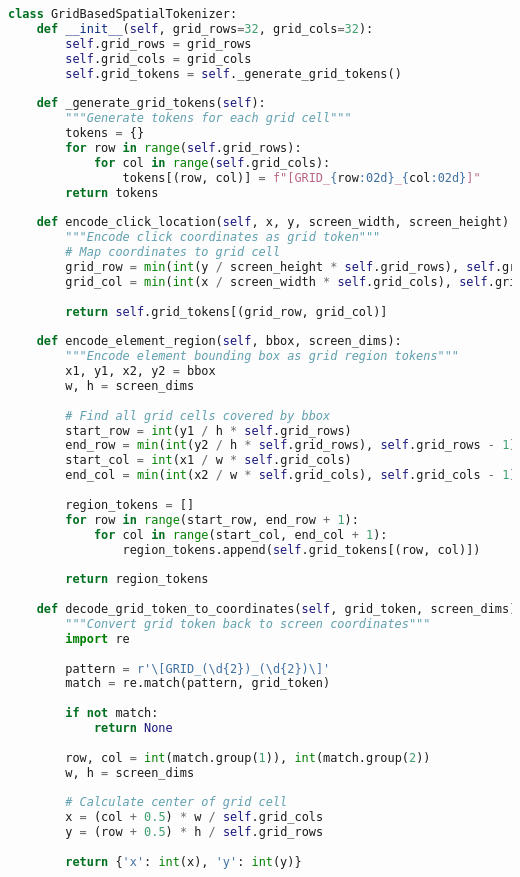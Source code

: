 \begin{lstlisting}[language=Python, caption=Grid-based spatial tokenization]
class GridBasedSpatialTokenizer:
    def __init__(self, grid_rows=32, grid_cols=32):
        self.grid_rows = grid_rows
        self.grid_cols = grid_cols
        self.grid_tokens = self._generate_grid_tokens()
        
    def _generate_grid_tokens(self):
        """Generate tokens for each grid cell"""
        tokens = {}
        for row in range(self.grid_rows):
            for col in range(self.grid_cols):
                tokens[(row, col)] = f"[GRID_{row:02d}_{col:02d}]"
        return tokens
    
    def encode_click_location(self, x, y, screen_width, screen_height):
        """Encode click coordinates as grid token"""
        # Map coordinates to grid cell
        grid_row = min(int(y / screen_height * self.grid_rows), self.grid_rows - 1)
        grid_col = min(int(x / screen_width * self.grid_cols), self.grid_cols - 1)
        
        return self.grid_tokens[(grid_row, grid_col)]
    
    def encode_element_region(self, bbox, screen_dims):
        """Encode element bounding box as grid region tokens"""
        x1, y1, x2, y2 = bbox
        w, h = screen_dims
        
        # Find all grid cells covered by bbox
        start_row = int(y1 / h * self.grid_rows)
        end_row = min(int(y2 / h * self.grid_rows), self.grid_rows - 1)
        start_col = int(x1 / w * self.grid_cols)
        end_col = min(int(x2 / w * self.grid_cols), self.grid_cols - 1)
        
        region_tokens = []
        for row in range(start_row, end_row + 1):
            for col in range(start_col, end_col + 1):
                region_tokens.append(self.grid_tokens[(row, col)])
        
        return region_tokens
    
    def decode_grid_token_to_coordinates(self, grid_token, screen_dims):
        """Convert grid token back to screen coordinates"""
        import re
        
        pattern = r'\[GRID_(\d{2})_(\d{2})\]'
        match = re.match(pattern, grid_token)
        
        if not match:
            return None
        
        row, col = int(match.group(1)), int(match.group(2))
        w, h = screen_dims
        
        # Calculate center of grid cell
        x = (col + 0.5) * w / self.grid_cols
        y = (row + 0.5) * h / self.grid_rows
        
        return {'x': int(x), 'y': int(y)}
\end{lstlisting}

